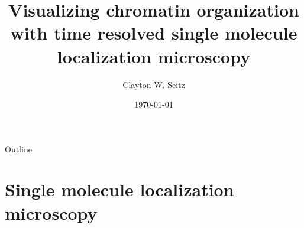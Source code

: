 \documentclass{beamer}					%
\title{Visualizing chromatin organization with time resolved single molecule localization microscopy}	%
\author{Clayton W. Seitz}								%
\date{\today}									%
\begin{document}
\begin{frame}
  \titlepage
\end{frame}

\begin{frame}{Outline}
    \tableofcontents
\end{frame}



%




\section{Single molecule localization microscopy}
\end{document}
